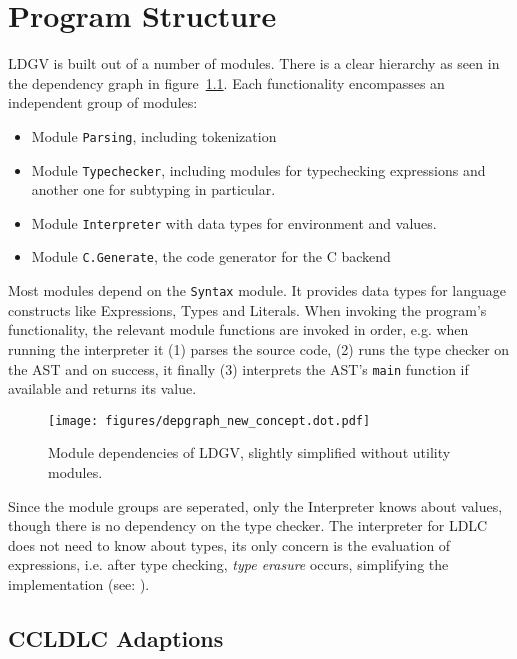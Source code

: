 \chapter{Program Structure}\label{chap:program-structure}

LDGV is built out of a number of modules. There is a clear hierarchy as seen in the dependency graph in figure~\ref{fig:dependency-graph}. Each functionality encompasses an independent group of modules:

\begin{itemize}
 \item Module \texttt{Parsing}, including tokenization
 \item Module \texttt{Typechecker}, including modules for typechecking expressions and another one for subtyping in particular.
 \item Module \texttt{Interpreter} with data types for environment and values.
 \item Module \texttt{C.Generate}, the code generator for the C backend
\end{itemize}

Most modules depend on the \texttt{Syntax} module. It provides data types for language constructs like Expressions, Types and Literals. When invoking the program's functionality, the relevant module functions are invoked in order, e.g. when running the interpreter it (1) parses the source code, (2) runs the type checker on the AST and on success, it finally (3) interprets the AST's \texttt{main} function if available and returns its value.

\begin{figure}
 \centering
 \texttt{[image: figures/depgraph\_new\_concept.dot.pdf]}
 \caption{Module dependencies of LDGV, slightly simplified without utility modules.}
 \label{fig:dependency-graph}
\end{figure}

Since the module groups are seperated, only the Interpreter knows about values, though there is no dependency on the type checker. The interpreter for LDLC does not need to know about types, its only concern is the evaluation of expressions, i.e. after type checking, \emph{type erasure} occurs, simplifying the implementation (see: \cite{crary2002}).

\section{CCLDLC Adaptions}

